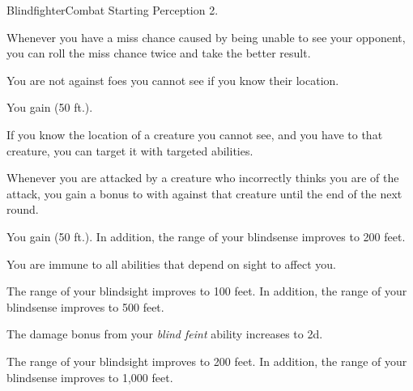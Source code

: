     \begin{feat}{Blindfighter}{Combat}
        \featpre Starting Perception 2.
        
         Whenever you have a miss chance caused by being unable to see your opponent, you can roll the miss chance twice and take the better result.

         You are not  against foes you cannot see if you know their location.

         You gain  (50 ft.).

         If you know the location of a creature you cannot see, and you have  to that creature, you can target it with targeted abilities.

         Whenever you are attacked by a creature who incorrectly thinks you are  of the attack, you gain a  bonus to  with  against that creature until the end of the next round.

         You gain  (50 ft.).
        In addition, the range of your blindsense improves to 200 feet. 

         You are immune to all abilities that depend on sight to affect you.

         The range of your blindsight improves to 100 feet.
        In addition, the range of your blindsense improves to 500 feet.

         The damage bonus from your \textit{blind feint} ability increases to \plus2d.

         The range of your blindsight improves to 200 feet.
        In addition, the range of your blindsense improves to 1,000 feet.
    \end{feat}

